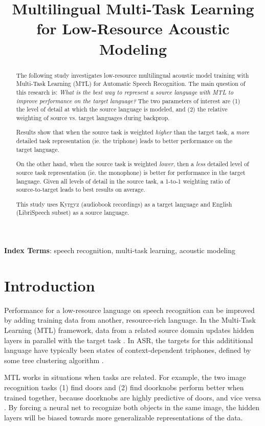\documentclass[a4paper]{article}
\title{Multilingual Multi-Task Learning for Low-Resource Acoustic Modeling}
\begin{document}
\maketitle
% 
\begin{abstract}

  The following study investigates low-resource multilingual acoustic model training with Multi-Task Learning (MTL) for Automatic Speech Recognition. The main question of this research is: \textit{What is the best way to represent a source language with MTL to improve performance on the target language?} The two parameters of interest are (1) the level of detail at which the source language is modeled, and (2) the relative weighting of source vs. target languages during backprop.

Results show that when the source task is weighted \textit{higher} than the target task, a \textit{more} detailed task representation (ie. the triphone) leads to better performance on the target language.

On the other hand, when the source task is weighted \textit{lower}, then a \textit{less} detailed level of source task representation (ie. the monophone) is better for performance in the target language. Given all levels of detail in the source task, a 1-to-1 weighting ratio of source-to-target leads to best results on average.

This study uses Kyrgyz (audiobook recordings) as a target language and English (LibriSpeech subset) as a source language.
\end{abstract}

\noindent\textbf{Index Terms}: speech recognition, multi-task learning, acoustic modeling





\section{Introduction}

Performance for a low-resource language on speech recognition can be improved by adding training data from another, resource-rich language. In the Multi-Task Learning (MTL) framework, data from a related source domain updates hidden layers in parallel with the target task \cite{caruana1997}. In ASR, the targets for this addititional language have typically been states of context-dependent triphones, defined by some tree clustering algorithm \cite{huang2013,heigold2013,grezl2016}.

MTL works in situations when tasks are related. For example, the two image recognition tasks (1) find doors and (2) find doorknobs perform better when trained together, because doorknobs are highly predictive of doors, and vice versa \cite{caruana1997}. By forcing a neural net to recognize both objects in the same image, the hidden layers will be biased towards more generalizable representations of the data.
\end{document}
